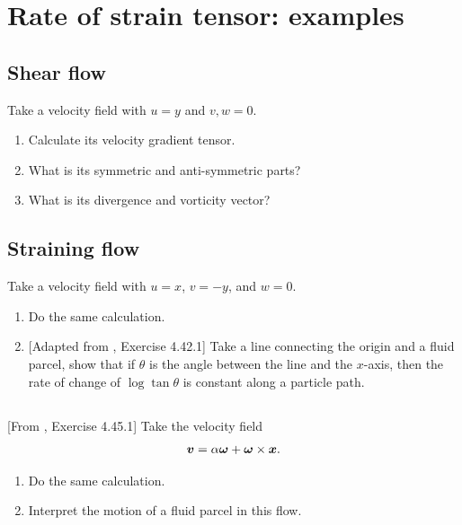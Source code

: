 \documentclass[11pt,letterpaper]{report}
\begin{document}
\section{Rate of strain tensor: examples}
\subsection{Shear flow}
Take a velocity field with $u=y$ and $v,w=0$. 
\begin{enumerate}
    \item Calculate its velocity gradient tensor.
    \item What is its symmetric and anti-symmetric parts?
    \item What is its divergence and vorticity vector? 
\end{enumerate}

\subsection{Straining flow}
Take a velocity field with $u=x$, $v=-y$, and $w=0$. 
\begin{enumerate}
    \item Do the same calculation.
    \item {[Adapted from \cite{Aris_62}, Exercise 4.42.1]} Take a line connecting the origin and a fluid parcel, show that if $\theta$ is the angle between the line and the $x$-axis, then the rate of change of $\log\tan\theta$ is constant along a particle path. 
\end{enumerate}

\subsection{}
[From \cite{Aris_62}, Exercise 4.45.1] Take the velocity field
\begin{align}
    \boldsymbol{v} = \alpha\boldsymbol{\omega} + \boldsymbol{\omega} \times \boldsymbol{x}.
\end{align}
\begin{enumerate}
    \item Do the same calculation.
    \item Interpret the motion of a fluid parcel in this flow.
\end{enumerate}
\end{document}
